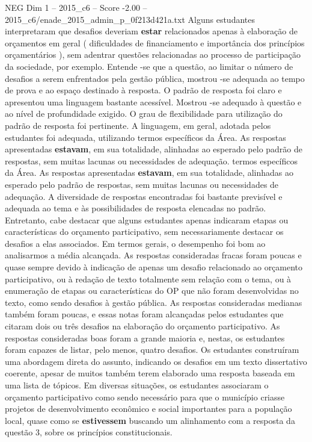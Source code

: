 \begin{textsample}{NEG Dim 1 – 2015\_c6 – Score -2.00 – 2015\_c6/enade\_2015\_admin\_p\_0f213d421a.txt}
Alguns estudantes interpretaram que desafios deveriam \textbf{estar} relacionados apenas à elaboração de orçamentos em geral ( dificuldades de financiamento e importância dos princípios orçamentários ), sem adentrar questões relacionadas ao processo de participação da sociedade, por exemplo.
Entende -se que a questão, ao limitar o número de desafios a serem enfrentados pela gestão pública, mostrou -se adequada ao tempo de prova e ao espaço destinado à resposta.
O padrão de resposta foi claro e apresentou uma linguagem bastante acessível.
Mostrou -se adequado à questão e ao nível de profundidade exigido.
O grau de flexibilidade para utilização do padrão de resposta foi pertinente.
A linguagem, em geral, adotada pelos estudantes foi adequada, utilizando termos específicos da Área.
As respostas apresentadas \textbf{estavam}, em sua totalidade, alinhadas ao esperado pelo padrão de respostas, sem muitas lacunas ou necessidades de adequação. termos específicos da Área.
As respostas apresentadas \textbf{estavam}, em sua totalidade, alinhadas ao esperado pelo padrão de respostas, sem muitas lacunas ou necessidades de adequação.
A diversidade de respostas encontradas foi bastante previsível e adequada ao tema e às possibilidades de resposta elencadas no padrão.
Entretanto, cabe destacar que alguns estudantes apenas indicaram etapas ou características do orçamento participativo, sem necessariamente destacar os desafios a elas associados.
Em termos gerais, o desempenho foi bom ao analisarmos a média alcançada.
As respostas consideradas fracas foram poucas e quase sempre devido à indicação de apenas um desafio relacionado ao orçamento participativo, ou à redação de texto totalmente sem relação com o tema, ou à enumeração de etapas ou características do OP que não foram desenvolvidas no texto, como sendo desafios à gestão pública.
As respostas consideradas medianas também foram poucas, e essas notas foram alcançadas pelos estudantes que citaram dois ou três desafios na elaboração do orçamento participativo.
As respostas consideradas boas foram a grande maioria e, nestas, os estudantes foram capazes de listar, pelo menos, quatro desafios.
Os estudantes construíram uma abordagem direta do assunto, indicando os desafios em um texto dissertativo coerente, apesar de muitos também terem elaborado uma resposta baseada em uma lista de tópicos.
Em diversas situações, os estudantes associaram o orçamento participativo como sendo necessário para que o município criasse projetos de desenvolvimento econômico e social importantes para a população local, quase como se \textbf{estivessem} buscando um alinhamento com a resposta da questão 3, sobre os princípios constitucionais.

\end{textsample}
